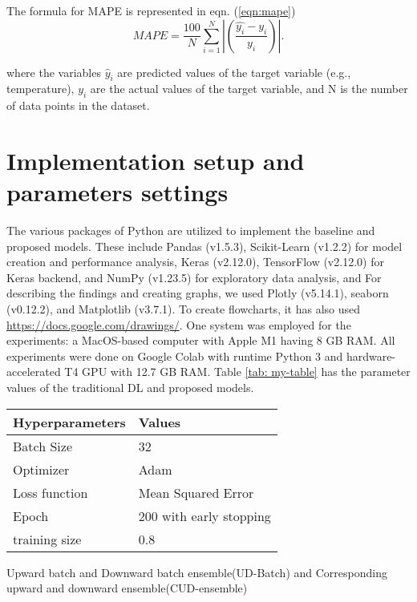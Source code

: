 The formula for MAPE is represented in eqn. (\ref{eqn:mape})
\begin{equation}
\label{eqn:mape}
MAPE = \frac{100}{N} \sum_{i=1}^{N} \left|(\frac{\hat{y_{i}} - y_{i}}{y_i})\right| .
\end{equation}


where the variables $\hat{y}_i$ are predicted values of the target variable (e.g., temperature), $y_i$ are the actual values of the target variable, and N is the number of data points in the dataset.



\section{Implementation setup and parameters settings}
The various packages of Python are utilized to implement the baseline and proposed models. These include Pandas (v1.5.3), Scikit-Learn (v1.2.2) for model creation and performance analysis, Keras (v2.12.0), TensorFlow (v2.12.0) for Keras backend, and NumPy (v1.23.5) for exploratory data analysis, and For describing the findings and creating graphs, we used Plotly (v5.14.1), seaborn (v0.12.2), and Matplotlib (v3.7.1). To create flowcharts, it has also used \href{https://docs.google.com/drawings/}{https://docs.google.com/drawings/}. One system was employed for the experiments: a MacOS-based computer with Apple M1 having 8 GB RAM. All experiments were done on Google Colab with runtime Python 3 and hardware-accelerated T4 GPU with 12.7 GB RAM. Table \ref{tab: my-table} has the parameter values of the traditional DL and proposed models.

\begin{table*}[h!]
\centering
\setlength{\tabcolsep}{3pt}
{\renewcommand{\arraystretch}{1}%

\caption{Parameter setting of traditional DL models and proposed MBiS-DT Models}
\label{tab: my-table}
\begin{tabular}{ll}
\hline Hyperparameters & Values \\ \hline
Batch Size & 32 \\
Optimizer & Adam \\
Loss function & Mean Squared Error \\
Epoch & 200 with early stopping \\
training size & 0.8 \\ \hline
\end{tabular}}
\end{table*}
Upward batch and Downward batch ensemble(UD-Batch) and Corresponding upward and downward ensemble(CUD-ensemble)

